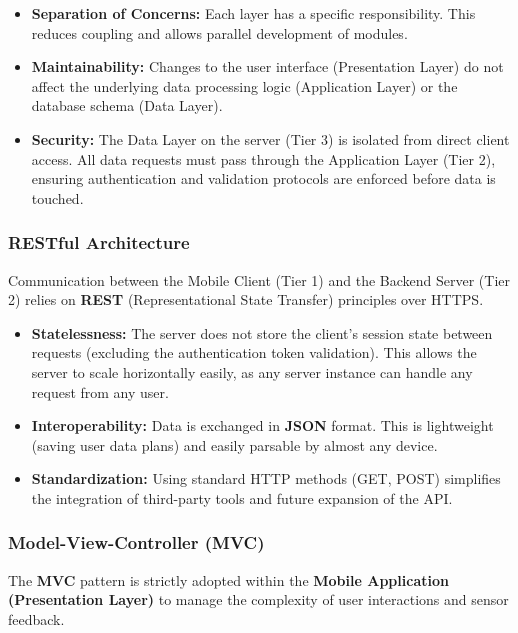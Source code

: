 \begin{itemize}
    \item \textbf{Separation of Concerns:} Each layer has a specific responsibility. This reduces coupling and allows parallel development of modules.
    \item \textbf{Maintainability:} Changes to the user interface (Presentation Layer) do not affect the underlying data processing logic (Application Layer) or the database schema (Data Layer).
    \item \textbf{Security:} The Data Layer on the server (Tier 3) is isolated from direct client access. All data requests must pass through the Application Layer (Tier 2), ensuring authentication and validation protocols are enforced before data is touched.
\end{itemize}

\subsubsection{RESTful Architecture}
Communication between the Mobile Client (Tier 1) and the Backend Server (Tier 2) relies on \textbf{REST} (Representational State Transfer) principles over HTTPS.

\begin{itemize}
    \item \textbf{Statelessness:} The server does not store the client's session state between requests (excluding the authentication token validation). This allows the server to scale horizontally easily, as any server instance can handle any request from any user.
    \item \textbf{Interoperability:} Data is exchanged in \textbf{JSON} format. This is lightweight (saving user data plans) and easily parsable by almost any device.
    \item \textbf{Standardization:} Using standard HTTP methods (GET, POST) simplifies the integration of third-party tools and future expansion of the API.
\end{itemize}

\subsubsection{Model-View-Controller (MVC)}
The \textbf{MVC} pattern is strictly adopted within the \textbf{Mobile Application (Presentation Layer)} to manage the complexity of user interactions and sensor feedback.


